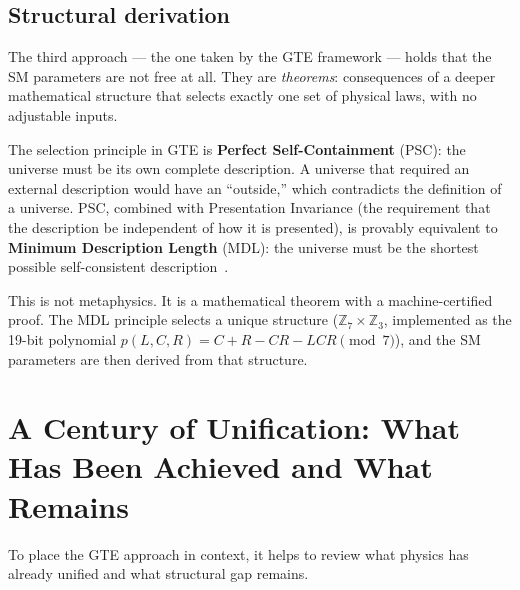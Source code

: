 \documentclass[11pt,a4paper]{article}
\newcommand{\term}[1]{\textbf{#1}}
\begin{document}
\subsection{Structural derivation}

The third approach --- the one taken by the GTE framework --- holds that
the SM parameters are not free at all.
They are \emph{theorems}: consequences of a deeper mathematical structure
that selects exactly one set of physical laws, with no adjustable inputs.

The selection principle in GTE is \term{Perfect Self-Containment} (PSC):
the universe must be its own complete description.
A universe that required an external description would have an ``outside,''
which contradicts the definition of a universe.
PSC, combined with Presentation Invariance (the requirement that the
description be independent of how it is presented), is provably equivalent
to \term{Minimum Description Length} (MDL): the universe must be
the shortest possible self-consistent description~\cite{SpivackGTECompleteFramework}.

This is not metaphysics.
It is a mathematical theorem with a machine-certified proof.
The MDL principle selects a unique structure
($\mathbb{Z}_7 \times \mathbb{Z}_3$, implemented as the
19-bit polynomial $p(L,C,R) = C + R - CR - LCR \pmod{7}$),
and the SM parameters are then derived from that structure.

\section{A Century of Unification: What Has Been Achieved and What Remains}
\label{sec:history}

To place the GTE approach in context, it helps to review what physics has
already unified and what structural gap remains.
\end{document}
